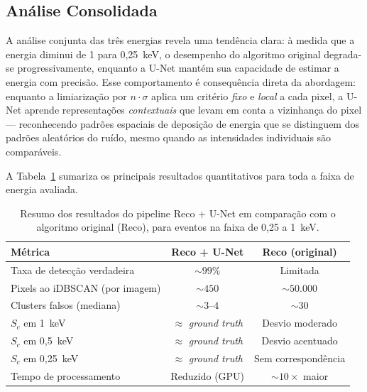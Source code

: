 \documentclass[
       oneside,
       english,
       brazil
       ]{abntbibufjf}
\begin{document}
\subsection{Análise Consolidada}

A análise conjunta das três energias revela uma tendência clara: à medida que
a energia diminui de 1 para 0,25~keV, o desempenho do algoritmo original
degrada-se progressivamente, enquanto a U-Net mantém sua capacidade de estimar
a energia com precisão. Esse comportamento é consequência direta da
abordagem: enquanto a limiarização por $n \cdot \sigma$ aplica um critério
\textit{fixo} e \textit{local} a cada pixel, a U-Net aprende representações
\textit{contextuais} que levam em conta a vizinhança do pixel — reconhecendo
padrões espaciais de deposição de energia que se distinguem dos padrões
aleatórios do ruído, mesmo quando as intensidades individuais são comparáveis.

A Tabela~\ref{tab:summary_results} sumariza os principais resultados
quantitativos para toda a faixa de energia avaliada.

\begin{table}[H]
\centering
\caption{Resumo dos resultados do pipeline Reco + U-Net em comparação com o
algoritmo original (Reco), para eventos na faixa de 0,25 a 1~keV.}
\label{tab:summary_results}
\begin{tabular}{p{6cm}cc}
\toprule
\textbf{Métrica} & \textbf{Reco + U-Net} & \textbf{Reco (original)} \\
\midrule
Taxa de detecção verdadeira     & ${\sim}99\%$                      & Limitada            \\
Pixels ao iDBSCAN (por imagem)  & ${\sim}450$                       & ${\sim}50{.}000$    \\
Clusters falsos (mediana)       & ${\sim}3$--$4$                    & ${\sim}30$          \\
$S_c$ em 1~keV                  & $\approx$ \textit{ground truth}   & Desvio moderado     \\
$S_c$ em 0,5~keV                & $\approx$ \textit{ground truth}   & Desvio acentuado    \\
$S_c$ em 0,25~keV               & $\approx$ \textit{ground truth}   & Sem correspondência \\
Tempo de processamento          & Reduzido (GPU)                    & ${\sim}10\times$ maior \\
\bottomrule
\end{tabular}
\end{table}
\end{document}
